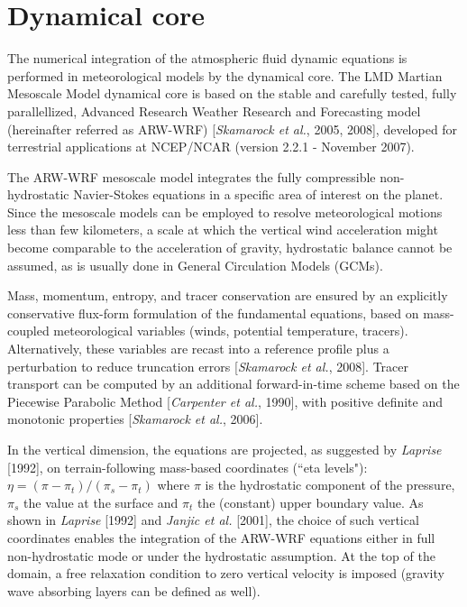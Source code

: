 \mk
\section{Dynamical core}

\sk
The numerical integration of the atmospheric fluid dynamic equations is performed in meteorological models by the dynamical core. The LMD Martian Mesoscale Model dynamical core is based on the stable and carefully tested, fully parallellized, Advanced Research Weather Research and Forecasting model (hereinafter referred as ARW-WRF) [\textit{Skamarock et al.}, 2005, 2008\nocite{Skam:08}\nocite{Skam:05}], developed for terrestrial applications at NCEP/NCAR (version 2.2.1 - November 2007).

\sk
The ARW-WRF mesoscale model integrates the fully compressible non-hydrostatic Navier-Stokes equations in a specific area of interest on the planet. Since the mesoscale models can be employed to resolve meteorological motions less than few kilometers, a scale at which the vertical wind acceleration might become comparable to the acceleration of gravity, hydrostatic balance cannot be assumed, as is usually done in General Circulation Models (GCMs).

\sk
Mass, momentum, entropy, and tracer conservation are ensured by an explicitly conservative flux-form formulation of the fundamental equations, based on mass-coupled meteorological variables (winds, potential temperature, tracers). Alternatively, these variables are recast into a reference profile plus a perturbation to reduce truncation errors [\textit{Skamarock et al.}, 2008]\nocite{Skam:08}. Tracer transport can be computed by an additional forward-in-time scheme based on the Piecewise Parabolic Method [\textit{Carpenter et al.}, 1990]\nocite{Carp:90}, with positive definite and monotonic properties
[\textit{Skamarock et al.}, 2006]\nocite{Skam:06}.

\sk
In the vertical dimension, the equations are projected, as suggested by \textit{Laprise} [1992]\nocite{Lapr:92}, on terrain-following mass-based coordinates (``eta levels"): $\eta = (\pi-\pi_t) / (\pi_s-\pi_t)$ where $\pi$ is the hydrostatic component of the pressure, $\pi_s$ the value at the surface and $\pi_t$ the (constant) upper boundary value. As shown in \textit{Laprise} [1992]\nocite{Lapr:92} and \textit{Janjic et al.} [2001]\nocite{Janj:01}, the choice of such vertical coordinates enables the integration of the ARW-WRF equations either in full non-hydrostatic mode or under the hydrostatic assumption. At the top of the domain, a free relaxation condition to zero vertical velocity is imposed (gravity wave absorbing layers can be defined as well).

